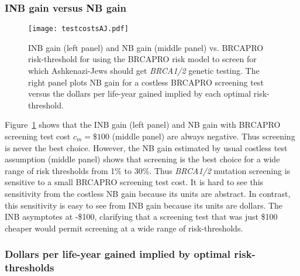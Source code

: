 \documentclass[11pt, letterpaper]{article}
\begin{document}
\subsubsection{INB gain versus NB gain}
\label{sec:INBvsNB}

\begin{figure}[t!]
	\centering
	\texttt{[image: testcostsAJ.pdf]}
	\caption{INB gain (left panel) and NB gain (middle panel) vs. BRCAPRO risk-threshold for using the BRCAPRO risk model to screen for which Ashkenazi-Jews should get \textit{BRCA1/2} genetic testing.  The right panel plots NB gain for a costless BRCAPRO screening test versus the dollars per life-year gained implied by each optimal risk-threshold.}
	\label{fig:testcostsAJ}
\end{figure}

Figure~\ref{fig:testcostsAJ} shows that the INB gain (left panel) and NB gain with BRCAPRO screening test cost $c_m=\$100$ (middle panel) are always negative.  Thus screening is never the best choice.  However, the NB gain estimated by usual costless test assumption (middle panel) shows that screening is the best choice for a wide range of risk thresholds from 1\% to 30\%.  Thus \textit{BRCA1/2} mutation screening is sensitive to a small BRCAPRO screening test cost.  It is hard to see this sensitivity from the costless NB gain because its units are abstract.  In contrast, this sensitivity is easy to see from INB gain because its units are dollars.  The INB asymptotes at -\$100, clarifying that a screening test that was just \$100 cheaper would permit screening at a wide range of risk-thresholds.

\subsubsection{Dollars per life-year gained implied by optimal risk-thresholds}
\label{sec:DollarsPerLYG}
\end{document}
